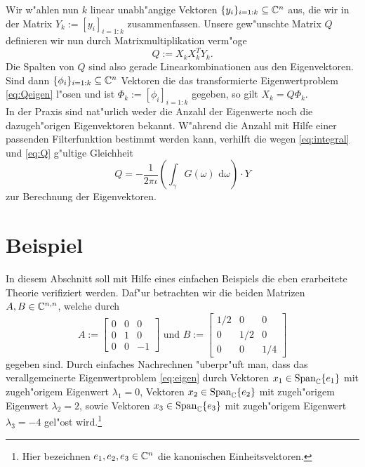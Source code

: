 Wir w"ahlen nun $k$ linear unabh"angige Vektoren $\{y_i\}_{i=1:k} \subseteq \mathbb{C}^n$
aus, die wir in der Matrix $Y_k := [ y_i ]_{i=1:k}$ zusammenfassen.
Unsere gew"unschte Matrix $Q$ definieren wir nun durch Matrixmultiplikation
verm"oge
\begin{equation}\label{eq:Q}
Q := X_k X_k^T Y_k.
\end{equation}
Die Spalten von $Q$ sind also gerade Linearkombinationen aus den Eigenvektoren.
Sind dann $\{\phi_i\}_{i=1:k} \subseteq \mathbb{C}^n$ Vektoren die das transformierte
Eigenwertproblem \eqref{eq:Qeigen} l"osen
und ist $\Phi_k:=[\phi_i]_{i=1:k}$ gegeben,
so gilt $X_k = Q \Phi_k$.\\

In der Praxis sind nat"urlich weder die Anzahl der Eigenwerte noch die dazugeh"origen Eigenvektoren
bekannt. W"ahrend die Anzahl mit Hilfe einer passenden Filterfunktion bestimmt werden kann,
verhilft die wegen \eqref{eq:integral} und \eqref{eq:Q} g"ultige Gleichheit
\begin{equation}\label{eq:solution}
Q = -\frac{1}{2\pi\iota}\left(\int_\gamma G(\omega)\text{ d}\omega\right)\cdot Y
\end{equation}
zur Berechnung der Eigenvektoren.

\newpage
\section{Beispiel}\label{sec:bsp}

In diesem Abschnitt soll mit Hilfe eines einfachen Beispiels die eben erarbeitete
Theorie verifiziert werden. Daf"ur betrachten wir die beiden Matrizen
$A,B \in \mathbb{C}^{n,n}$, welche durch
\[
A:= \begin{bmatrix} 0 & 0 & 0 \\ 0 & 1 & 0 \\ 0 & 0 & -1 \end{bmatrix} \text{ und }
B:= \begin{bmatrix} 1/2 & 0 & 0\\ 0 & 1/2 & 0 \\ 0 & 0 & 1/4 \end{bmatrix}
\]
gegeben sind. Durch einfaches Nachrechnen "uberpr"uft man, dass das
verallgemeinerte Eigenwertproblem \eqref{eq:eigen} durch Vektoren
$x_1 \in \text{Span}_{\mathbb{C}}\{e_1\}$ mit zugeh"origem Eigenwert $\lambda_1 = 0$, Vektoren
$x_2 \in \text{Span}_{\mathbb{C}}\{e_2\}$ mit zugeh"origem Eigenwert $\lambda_2 = 2$, sowie
Vektoren $x_3 \in\text{Span}_{\mathbb{C}}\{e_3\}$ mit zugeh"origem Eigenwert $\lambda_3 = -4$
gel"ost wird.\footnote{Hier bezeichnen $e_1, e_2, e_3 \in\mathbb{C}^n$ die kanonischen Einheitsvektoren.}\\

